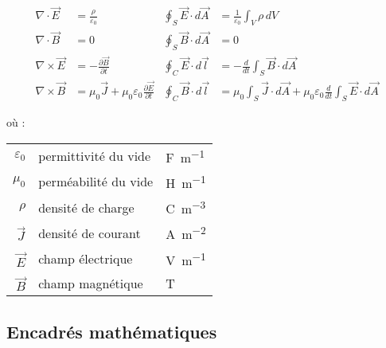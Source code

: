 \begin{subequations}
    \begin{align}
        \nabla \cdot \vec{E}  & = \frac{\rho}{\varepsilon_0}                                              & \oint_{S} \vec{E} \cdot d\vec{A} & = \frac{1}{\varepsilon_0} \int_{V} \rho \, dV                                                              \\[1em]
        \nabla \cdot \vec{B}  & = 0                                                                       & \oint_{S} \vec{B} \cdot d\vec{A} & = 0                                                                                                        \\[1em]
        \nabla \times \vec{E} & = -\frac{\partial \vec{B}}{\partial t}                                    & \oint_{C} \vec{E} \cdot d\vec{l} & = -\frac{d}{dt} \int_{S} \vec{B} \cdot d\vec{A}                                                            \\[1em]
        \nabla \times \vec{B} & = \mu_0 \vec{J} + \mu_0 \varepsilon_0 \frac{\partial \vec{E}}{\partial t} & \oint_{C} \vec{B} \cdot d\vec{l} & = \mu_0 \int_{S} \vec{J} \cdot d\vec{A} + \mu_0 \varepsilon_0 \frac{d}{dt} \int_{S} \vec{E} \cdot d\vec{A}
    \end{align}
\end{subequations}

\vspace{1em}

où :

\begin{tabular}{rll}
    $\varepsilon_0$ & permittivité du vide & \si{\farad\per\meter}          \\
    $\mu_0$         & perméabilité du vide & \si{\henry\per\meter}          \\
    $\rho$          & densité de charge    & \si{\coulomb\per\meter\cubed}  \\
    $\vec{J}$       & densité de courant   & \si{\ampere\per\meter\squared} \\
    $\vec{E}$       & champ électrique     & \si{\volt\per\meter}           \\
    $\vec{B}$       & champ magnétique     & \si{\tesla}                    \\
\end{tabular}

\subsection{Encadrés mathématiques}

